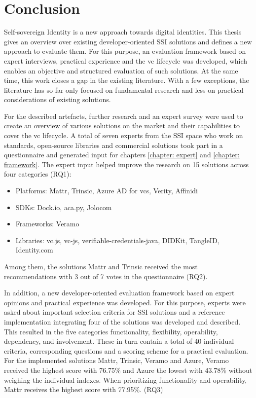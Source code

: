 \chapter{Conclusion}


Self-sovereign Identity is a new approach towards digital identities. This thesis gives an overview over existing developer-oriented \ac{SSI} solutions and defines a new approach to evaluate them. For this purpose, an evaluation framework based on expert interviews, practical experience and the \ac{vc} lifecycle was developed, which enables an objective and structured evaluation of such solutions. At the same time, this work closes a gap in the existing literature. With a few exceptions, the literature has so far only focused on fundamental research and less on practical considerations of existing solutions.

For the described artefacts, further research and an expert survey were used to create an overview of various solutions on the market and their capabilities to cover the \ac{vc} lifecycle. A total of seven experts from the \ac{SSI} space who work on standards, open-source libraries and commercial solutions took part in a questionnaire and generated input for chapters \ref{chapter: expert} and \ref{chapter: framework}.
The expert input helped improve the research on 15 solutions across four categories (RQ1):
\begin{itemize}
    \item Platforms: Mattr, Trinsic, Azure AD for \acp{vc}, Verity, Affinidi
    \item SDKs: Dock.io, aca.py, Jolocom
    \item Frameworks: Veramo
    \item Libraries: vc.js, vc-js, verifiable-credentials-java, DIDKit, TangleID, Identity.com 
\end{itemize}
Among them, the solutions Mattr and Trinsic received the most recommendations with 3 out of 7 votes in the questionnaire (RQ2).

In addition, a new developer-oriented evaluation framework based on expert opinions and practical experience was developed. For this purpose, experts were asked about important selection criteria for \ac{SSI} solutions and a reference implementation integrating four of the solutions was developed and described. This resulted in the five categories functionality, flexibility, operability, dependency, and involvement. These in turn contain a total of 40 individual criteria, corresponding questions and a scoring scheme for a practical evaluation. For the implemented solutions Mattr, Trinsic, Veramo and Azure, Veramo received the highest score with 76.75\% and Azure the lowest with 43.78\% without weighing the individual indexes. When prioritizing functionality and operability, Mattr receives the highest score with 77.95\%. (RQ3)

